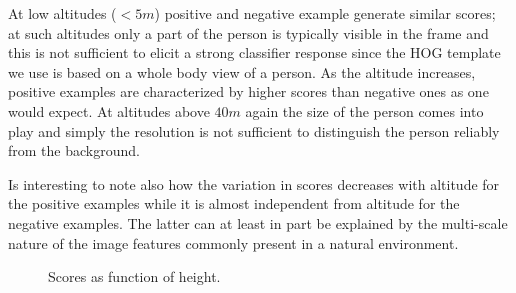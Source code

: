 \documentclass[a4paper,11pt]{report}
\begin{document}
At low altitudes ($<5m$) positive and negative example generate similar scores; at such altitudes only a part of the person is typically visible in the frame and this is not sufficient to elicit a strong classifier response since the HOG template we use is based on a whole body view of a person. As the altitude increases, positive examples are characterized by higher scores than negative ones as one would expect. At altitudes above $40m$ again the size of the person comes into play and simply the resolution is not sufficient to distinguish the person reliably from the background.

Is interesting to note also how the variation in scores decreases with altitude for the positive examples while it is almost independent from altitude for the negative examples. The latter can at least in part be explained by the multi-scale nature of the image features commonly present in a natural environment.   

\begin{figure}[ht]
\centering
{}
\quad
{}
\caption{Scores as function of height.\label{fig:dataandmodels}}
\end{figure}
\end{document}
